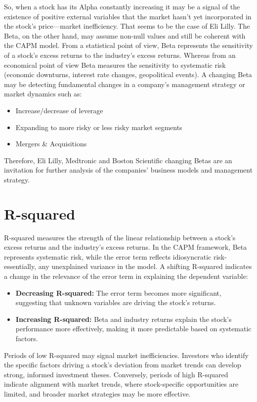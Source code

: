 So, when a stock has its Alpha constantly increasing it may be a signal of the existence of positive external variables that
the market hasn't yet incorporated in the stock's price—market inefficiency. That seems to be the case of Eli Lilly.
The Beta, on the other hand, may assume non-null values and still be coherent with the CAPM model. 
From a statistical point of view, Beta represents the sensitivity of a stock's excess returns to the industry's excess returns.
Whereas from an economical point of view Beta measures the sensitivity to systematic risk (economic downturns, interest rate 
changes, geopolitical events).
A changing Beta may be detecting fundamental changes in a company's management strategy or market dynamics such as:
\begin{itemize}
    \item Increase/decrease of leverage
    \item Expanding to more risky or less risky market segments
    \item Mergers \& Acquisitions
\end{itemize}

Therefore, Eli Lilly, Medtronic and Boston Scientific changing Betas are an invitation for further analysis of the companies' 
business models and management strategy.

\section{R-squared}

R-squared measures the strength of the linear relationship between a stock's excess returns and the industry's excess returns. 
In the CAPM framework, Beta represents systematic risk, while the error term reflects idiosyncratic risk-essentially, any
unexplained variance in the model.
A shifting R-squared indicates a change in the relevance of the error term in explaining the dependent variable:

\begin{itemize}
    \item \textbf{Decreasing R-squared:} The error term becomes more significant, suggesting that unknown variables are
    driving the stock's returns.
    \item \textbf{Increasing R-squared:} Beta and industry returns explain the stock's performance more effectively, making it
    more predictable based on systematic factors.
\end{itemize}

Periods of low R-squared may signal market inefficiencies. Investors who identify the specific factors driving a stock's
deviation from market trends can develop strong, informed investment theses. 
Conversely, periods of high R-squared indicate alignment with market trends, where stock-specific opportunities are limited,
and broader market strategies may be more effective.

